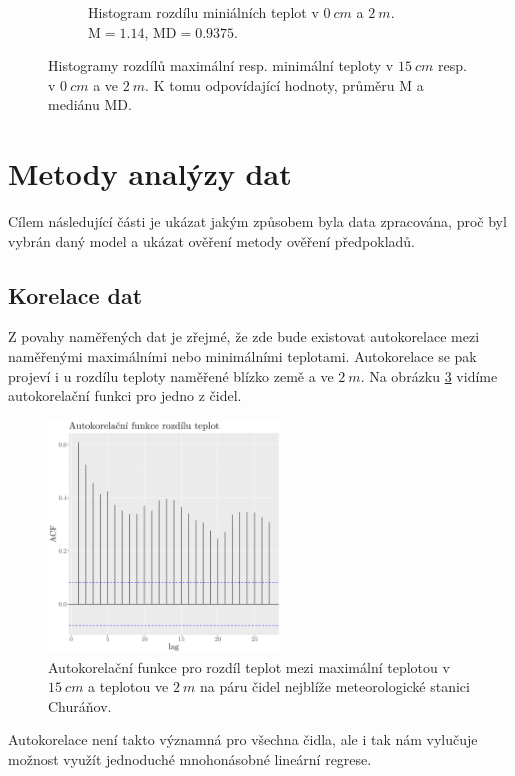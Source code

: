 \begin{figure}
\begin{subfigure}{0.45\textwidth}
		\caption{Histogram rozdílu miniálních teplot v $\SI{0}{cm}$ a $\SI{2}{m}$. $\text{M} = 1.14$, $\text{MD} = 0.9375$.}
		\label{fig:hist_diff_min0cm}
	\end{subfigure}
	\caption{Histogramy rozdílů maximální resp. minimální teploty v $\SI{15}{cm}$ resp. v $\SI{0}{cm}$ a ve $\SI{2}{m}$. K tomu odpovídající hodnoty, průměru $\text{M}$ a mediánu $\text{MD}$.}
	\label{fig:hist_diff}
\end{figure}


\section{Metody analýzy dat}\label{chap:methods}
Cílem následující části je ukázat jakým způsobem byla data zpracována, proč byl vybrán daný model a ukázat ověření metody ověření předpokladů.

\subsection{Korelace dat}
Z povahy naměřených dat je zřejmé, že zde bude existovat autokorelace mezi naměřenými maximálními nebo minimálními teplotami. Autokorelace se pak projeví i u rozdílu teploty naměřené blízko země a ve $\SI{2}{m}$. Na obrázku \ref{fig:acf} vidíme autokorelační funkci pro jedno z čidel.

\begin{figure}
	\centering
	\includegraphics[width=0.55\textwidth]{img/ch2/acfNPS_4311_D_TMS.png}
	\caption{Autokorelační funkce pro rozdíl teplot mezi maximální teplotou v $\SI{15}{cm}$ a teplotou ve $\SI{2}{m}$ na páru čidel nejblíže meteorologické stanici Churáňov.}
	\label{fig:acf}
\end{figure}

Autokorelace není takto významná pro všechna čidla, ale i tak nám vylučuje možnost využít jednoduché mnohonásobné lineární regrese.


